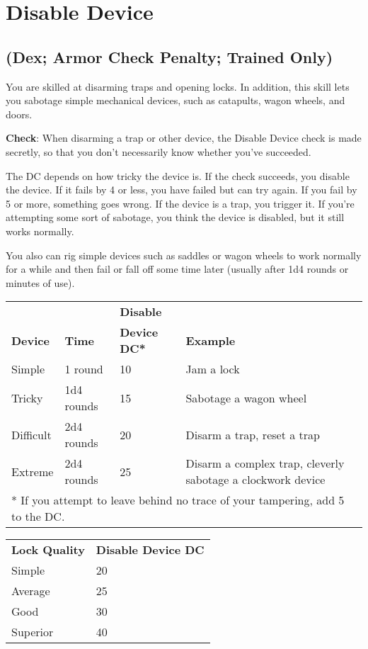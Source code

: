 \section{Disable Device}

\label{f0}				
\subsection{(Dex; Armor Check Penalty; Trained Only)}

				
You are skilled at disarming traps and opening locks. In addition, this skill lets you sabotage simple mechanical devices, such as catapults, wagon wheels, and doors.
				
\textbf{Check}: When disarming a trap or other device, the Disable Device check is made secretly, so that you don't necessarily know whether you've succeeded.
				
The DC depends on how tricky the device is. If the check succeeds, you disable the device. If it fails by 4 or less, you have failed but can try again. If you fail by 5 or more, something goes wrong. If the device is a trap, you trigger it. If you're attempting some sort of sabotage, you think the device is disabled, but it still works normally.
				
You also can rig simple devices such as saddles or wagon wheels to work normally for a while and then fail or fall off some time later (usually after 1d4 rounds or minutes of use).
				

\begin{table}
 \sffamily
 \begin{tabularx}{\linewidth}{lllX}
                &               & \textbf{Disable} & \\
\textbf{Device} & \textbf{Time} & \textbf{Device DC*} & \textbf{Example}\\
Simple & 1 round & 10 & Jam a lock\\
Tricky & 1d4 rounds & 15 & Sabotage a wagon wheel\\
Difficult & 2d4 rounds & 20 & Disarm a trap, reset a trap\\
Extreme & 2d4 rounds & 25 & Disarm a complex trap, cleverly sabotage a clockwork device\\
\multicolumn{4}{l}{* If you attempt to leave behind no trace of your tampering, add 5 to the DC.}
 \end{tabularx}

\end{table}

\begin{table}
\sffamily
 \begin{tabularx}{\linewidth}{Xl}
\textbf{Lock Quality} & \textbf{Disable Device DC} \\
Simple & 20\\
Average & 25\\
Good & 30\\
Superior & 40\\  
 \end{tabularx}
\end{table}
				
